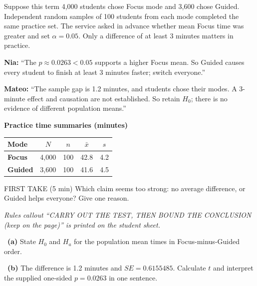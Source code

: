 \documentclass[11pt]{article}
\begin{document}
Suppose this term 4{,}000 students chose Focus mode and 3{,}600 chose Guided. Independent random samples of 100 students from each mode completed the same practice set. The service asked in advance whether mean Focus time was greater and set $\alpha=0.05$. Only a difference of at least 3 minutes matters in practice.\par\smallskip \textbf{Nia:} ``The $p\approx0.0263<0.05$ supports a higher Focus mean. So Guided causes every student to finish at least 3 minutes faster; switch everyone.''\par \textbf{Mateo:} ``The sample gap is 1.2 minutes, and students chose their modes. A 3-minute effect and causation are not established. So retain $H_0$; there is no evidence of different population means.''\par
\begin{center}
\textbf{Practice time summaries (minutes)}\par\smallskip
\begin{tabular}{|l|c|c|c|c|}
\hline
\textbf{Mode} & \textbf{$N$} & \textbf{$n$} & \textbf{$\bar x$} & \textbf{$s$} \\ \hline
\textbf{Focus} & 4{,}000 & 100 & 42.8 & 4.2 \\ \hline
\textbf{Guided} & 3{,}600 & 100 & 41.6 & 4.5 \\ \hline
\end{tabular}
\end{center}
\begin{firsttakebox}{FIRST TAKE (5 min)}
Which claim seems too strong: no average difference, or Guided helps everyone? Give one reason.\par
{}
\end{firsttakebox}

\textit{Rules callout ``CARRY OUT THE TEST, THEN BOUND THE CONCLUSION (keep on the page)'' is printed on the student sheet.}\par\medskip

~\textbf{(a)} State $H_0$ and $H_a$ for the population mean times in Focus-minus-Guided order.\par
{}

~\textbf{(b)} The difference is 1.2 minutes and $SE=0.6155485$. Calculate $t$ and interpret the supplied one-sided $p=0.0263$ in one sentence.\par
{}
\end{document}
